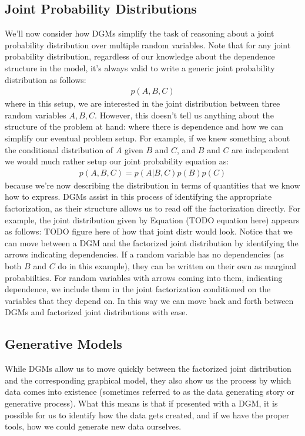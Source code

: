 \subsection{Joint Probability Distributions}
We'll now consider how DGMs simplify the task of reasoning about a joint probability distribution over multiple random variables. Note that for any joint probability distribution, regardless of our knowledge about the dependence structure in the model, it's always valid to write a generic joint probability distribution as follows:
\begin{align*}
	p(A, B, C)
\end{align*}
where in this setup, we are interested in the joint distribution between three random variables $A, B, C$. However, this doesn't tell us anything about the structure of the problem at hand: where there is dependence and how we can simplify our eventual problem setup. For example, if we knew something about the conditional distribution of $A$ given $B$ and $C$, and $B$ and $C$ are independent we would much rather setup our joint probability equation as:
\begin{align*}
	p(A, B, C) = p(A | B, C)p(B)p(C)
\end{align*}
because we're now describing the distribution in terms of quantities that we know how to express. DGMs assist in this process of identifying the appropriate factorization, as their structure allows us to read off the factorization directly. For example, the joint distribution given by Equation (TODO equation here) appears as follows:
TODO figure here of how that joint distr would look.
Notice that we can move between a DGM and the factorized joint distribution by identifying the arrows indicating dependencies. If a random variable has no dependencies (as both $B$ and $C$ do in this example), they can be written on their own as marginal probabiilties. For random variables with arrows coming into them, indicating dependence, we include them in the joint factorization conditioned on the variables that they depend on. In this way we can move back and forth between DGMs and factorized joint distributions with ease.

\subsection{Generative Models}
While DGMs allow us to move quickly between the factorized joint distribution and the corresponding graphical model, they also show us the process by which data comes into existence (sometimes referred to as the data generating story or generative process). What this means is that if presented with a DGM, it is possible for us to identify how the data gets created, and if we have the proper tools, how we could generate new data ourselves.

